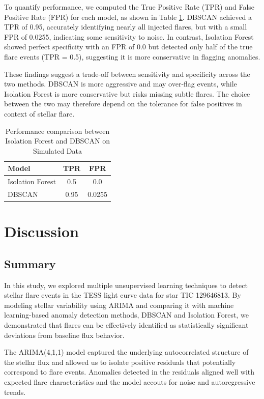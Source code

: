 \documentclass[
]{article}
\begin{document}
To quantify performance, we computed the True Positive Rate (TPR) and False Positive Rate (FPR) for each model, as shown in Table \ref{tab:compare}. DBSCAN achieved a TPR of 0.95, accurately identifying nearly all injected flares, but with a small FPR of 0.0255, indicating some sensitivity to noise. In contrast, Isolation Forest showed perfect specificity with an FPR of 0.0 but detected only half of the true flare events (TPR = 0.5), suggesting it is more conservative in flagging anomalies.

These findings suggest a trade-off between sensitivity and specificity across the two methods. DBSCAN is more aggressive and may over-flag events, while Isolation Forest is more conservative but risks missing subtle flares. The choice between the two may therefore depend on the tolerance for false positives in context of stellar flare.

\begin{table}[ht] 
\centering 
\caption{Performance comparison between Isolation Forest and DBSCAN on Simulated Data} \label{tab:compare} 
\begin{tabular}{lcc} 
\hline 
Model & TPR & FPR \\
\hline 
Isolation Forest & 0.5 & 0.0 \\
DBSCAN & 0.95 & 0.0255 \\
\hline 
\end{tabular} 
\end{table}

\section{Discussion}\label{sec-discussion}

\subsection{Summary}\label{summary}

In this study, we explored multiple unsupervised learning techniques to detect stellar flare events in the TESS light curve data for star TIC 129646813. By modeling stellar variability using ARIMA and comparing it with machine learning-based anomaly detection methods, DBSCAN and Isolation Forest, we demonstrated that flares can be effectively identified as statistically significant deviations from baseline flux behavior.

The ARIMA(4,1,1) model captured the underlying autocorrelated structure of the stellar flux and allowed us to isolate positive residuals that potentially correspond to flare events. Anomalies detected in the residuals aligned well with expected flare characteristics and the model accouts for noise and autoregressive trends.
\end{document}
